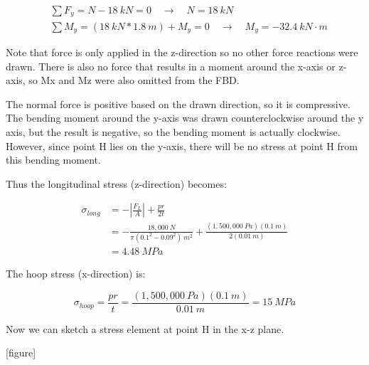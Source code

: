 \documentclass[
  letterpaper,
  DIV=11,
  numbers=noendperiod]{scrreprt}
\theoremstyle{definition}
\theoremstyle{remark}
\begin{document}
\begin{tcolorbox}
\begin{tcolorbox}
\[
\begin{aligned}
&\sum F_y=N-18{~kN}=0 \quad\rightarrow\quad N=18{~kN} \\
&\sum M_y=(18{~kN}*1.8{~m})+M_y=0 \quad\rightarrow\quad M_y=-32.4{~kN}\cdot{m}
\end{aligned}
\]

Note that force is only applied in the z-direction so no other force
reactions were drawn. There is also no force that results in a moment
around the x-axis or z-axis, so Mx and Mz were also omitted from the
FBD.

The normal force is positive based on the drawn direction, so it is
compressive. The bending moment around the y-axis was drawn
counterclockwise around the y axis, but the result is negative, so the
bending moment is actually clockwise. However, since point H lies on the
y-axis, there will be no stress at point H from this bending moment.~

Thus the longitudinal stress (z-direction) becomes:

\[
\begin{aligned}
\sigma_{long}&=-\left|\frac{F_L}{A}\right|+\frac{pr}{2t} \\
&=-\frac{18,000{~N}}{\pi\left(0.1^2-0.09^2\right){~m^2}}+\frac{(1,500,000{~Pa})(0.1{~m})}{2(0.01{~m})} \\
&=4.48{~MPa}
\end{aligned}
\]

The hoop stress (x-direction) is:

\[
\sigma_{hoop}=\frac{pr}{t}=\frac{(1,500,000{~Pa})(0.1{~m})}{0.01{~m}}=15{~MPa}
\]

Now we can sketch a stress element at point H in the x-z plane.

{[}figure{]}

\end{tcolorbox}

\end{tcolorbox}
\end{document}

